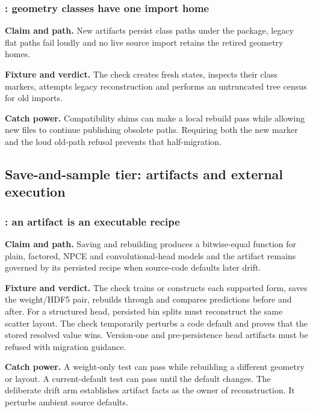 \subsubsection{: geometry classes have one import home}

\textbf{Claim and path.}  New artifacts persist class paths under the
 package, legacy flat paths fail loudly and no live
source import retains the retired geometry homes.

\textbf{Fixture and verdict.}  The check creates fresh states, inspects their
class markers, attempts legacy reconstruction and performs an untruncated
tree census for old imports.

\textbf{Catch power.}  Compatibility shims can make a local rebuild pass while
allowing new files to continue publishing obsolete paths.  Requiring both the
new marker and the loud old-path refusal prevents that half-migration.

\subsection{Save-and-sample tier: artifacts and external execution}

\subsubsection{: an artifact is an executable recipe}

\textbf{Claim and path.}  Saving and rebuilding produces a bitwise-equal
function for plain, factored, NPCE and convolutional-head models and the
artifact remains governed by its persisted recipe when source-code defaults
later drift.

\textbf{Fixture and verdict.}  The check trains or constructs each supported
form, saves the weight/HDF5 pair, rebuilds through
 and compares predictions before and after.  For a
structured head, persisted bin splits must reconstruct the same scatter
layout.  The check temporarily perturbs a code default and proves that the
stored resolved value wins.  Version-one and pre-persistence head artifacts
must be refused with migration guidance.

\textbf{Catch power.}  A weight-only test can pass while rebuilding a
different geometry or layout.  A current-default test can pass until the
default changes.  The deliberate drift arm establishes artifact facts as the
owner of reconstruction.  It perturbs ambient source defaults.

